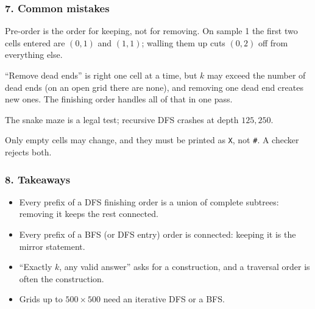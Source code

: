 \subsubsection*{7. Common mistakes}

\begin{warningbox}
Pre-order is the order for keeping, not for removing. On sample 1 the first two cells entered are $(0,1)$ and $(1,1)$; walling them up cuts $(0,2)$ off from everything else.
\end{warningbox}

\begin{warningbox}
``Remove dead ends'' is right one cell at a time, but $k$ may exceed the number of dead ends (on an open grid there are none), and removing one dead end creates new ones. The finishing order handles all of that in one pass.
\end{warningbox}

\begin{warningbox}
The snake maze is a legal test; recursive DFS crashes at depth $125{,}250$.
\end{warningbox}

\begin{warningbox}
Only empty cells may change, and they must be printed as \texttt{X}, not \texttt{\#}. A checker rejects both.
\end{warningbox}

\subsubsection*{8. Takeaways}

\begin{itemize}[leftmargin=*]
    \item Every prefix of a DFS finishing order is a union of complete subtrees: removing it keeps the rest connected.
    \item Every prefix of a BFS (or DFS entry) order is connected: keeping it is the mirror statement.
    \item ``Exactly $k$, any valid answer'' asks for a construction, and a traversal order is often the construction.
    \item Grids up to $500 \times 500$ need an iterative DFS or a BFS.
\end{itemize}

